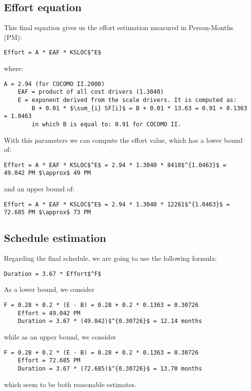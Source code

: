 \subsection{Effort equation}
This final equation gives us the effort estimation measured in Person-Months (PM):
\begin{lstlisting}[mathescape, numbers=none]
	Effort = A * EAF * KSLOC$^E$
\end{lstlisting}
where:
\begin{lstlisting}[mathescape, numbers=none]
	A = 2.94 (for COCOMO II.2000) 
	EAF = product of all cost drivers (1.3040)
	E = exponent derived from the scale drivers. It is computed as:
		B + 0.01 * $\sum_{i} SF[i]$ = B + 0.01 * 13.63 = 0.91 + 0.1363 = 1.0463
		in which B is equal to: 0.91 for COCOMO II.
\end{lstlisting}

With this parameters we can compute the effort value, which has a lower bound of:
\begin{lstlisting}[mathescape, numbers=none]
	Effort = A * EAF * KSLOC$^E$ = 2.94 * 1.3040 * 8418$^{1.0463}$ = 49.042 PM $\approx$ 49 PM
\end{lstlisting}
and an upper bound of:
\begin{lstlisting}[mathescape, numbers=none]
	Effort = A * EAF * KSLOC$^E$ = 2.94 * 1.3040 * 12261$^{1.0463}$ = 72.685 PM $\approx$ 73 PM
\end{lstlisting}

\subsection{Schedule estimation}
Regarding the final schedule, we are going to use the following formula:
\begin{lstlisting}[mathescape, numbers=none]
	Duration = 3.67 * Effort$^F$
\end{lstlisting}
As a lower bound, we consider
\begin{lstlisting}[mathescape, numbers=none]
	F = 0.28 + 0.2 * (E - B) = 0.28 + 0.2 * 0.1363 = 0.30726
	Effort = 49.042 PM 
	Duration = 3.67 * (49.042)$^{0.30726}$ = 12.14 months
\end{lstlisting}
while as an upper bound, we consider
\begin{lstlisting}[mathescape, numbers=none]
	F = 0.28 + 0.2 * (E - B) = 0.28 + 0.2 * 0.1363 = 0.30726
	Effort = 72.685 PM 
	Duration = 3.67 * (72.685)$^{0.30726}$ = 13.70 months
\end{lstlisting}
which seem to be both reasonable estimates.